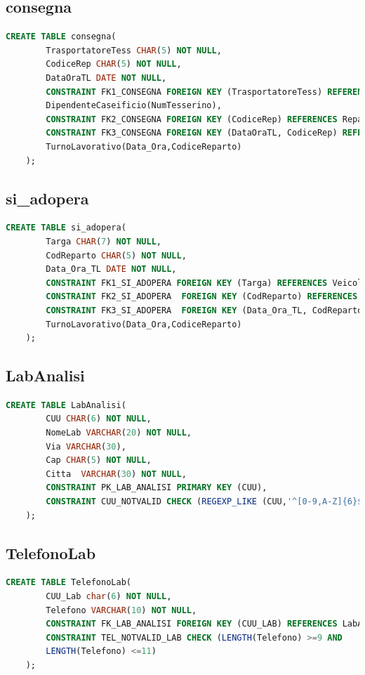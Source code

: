 \documentclass[12pt]{report}
\begin{document}
\subsection*{consegna}
\begin{lstlisting}[language=SQL]
    CREATE TABLE consegna(
        TrasportatoreTess CHAR(5) NOT NULL,
        CodiceRep CHAR(5) NOT NULL,
        DataOraTL DATE NOT NULL,
        CONSTRAINT FK1_CONSEGNA FOREIGN KEY (TrasportatoreTess) REFERENCES 
        DipendenteCaseificio(NumTesserino),
        CONSTRAINT FK2_CONSEGNA FOREIGN KEY (CodiceRep) REFERENCES Reparto(CodR),
        CONSTRAINT FK3_CONSEGNA FOREIGN KEY (DataOraTL, CodiceRep) REFERENCES
        TurnoLavorativo(Data_Ora,CodiceReparto)
    );
\end{lstlisting}

\subsection*{si\_adopera}
\begin{lstlisting}[language=SQL]
    CREATE TABLE si_adopera(
        Targa CHAR(7) NOT NULL,
        CodReparto CHAR(5) NOT NULL,
        Data_Ora_TL DATE NOT NULL,
        CONSTRAINT FK1_SI_ADOPERA FOREIGN KEY (Targa) REFERENCES Veicolo(Targa),
        CONSTRAINT FK2_SI_ADOPERA  FOREIGN KEY (CodReparto) REFERENCES Reparto(CodR),
        CONSTRAINT FK3_SI_ADOPERA  FOREIGN KEY (Data_Ora_TL, CodReparto) REFERENCES
        TurnoLavorativo(Data_Ora,CodiceReparto)
    );
\end{lstlisting}

\newpage

\subsection*{LabAnalisi}
\begin{lstlisting}[language=SQL]
    CREATE TABLE LabAnalisi(
        CUU	CHAR(6)	NOT NULL, 
        NomeLab	VARCHAR(20)	NOT NULL, 
        Via VARCHAR(30), 
        Cap CHAR(5) NOT NULL, 
        Citta  VARCHAR(30) NOT NULL,
        CONSTRAINT PK_LAB_ANALISI PRIMARY KEY (CUU),
        CONSTRAINT CUU_NOTVALID CHECK (REGEXP_LIKE (CUU,'^[0-9,A-Z]{6}$'))
    );
\end{lstlisting}

\subsection*{TelefonoLab}
\begin{lstlisting}[language=SQL]
    CREATE TABLE TelefonoLab(
        CUU_Lab	char(6)	NOT NULL, 
        Telefono VARCHAR(10) NOT NULL, 
        CONSTRAINT FK_LAB_ANALISI FOREIGN KEY (CUU_LAB) REFERENCES LabAnalisi (CUU),
        CONSTRAINT TEL_NOTVALID_LAB CHECK (LENGTH(Telefono) >=9 AND 
        LENGTH(Telefono) <=11)
    );
\end{lstlisting}
\end{document}
